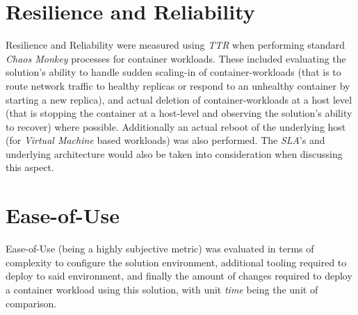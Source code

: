 \section{Resilience and Reliability}
Resilience and Reliability were measured using \textit{TTR} when performing standard \textit{Chaos Monkey} processes for container workloads.
These included evaluating the solution's ability to handle sudden scaling-in of container-workloads (that is to route network traffic to healthy replicas or respond to an unhealthy container by starting a new replica),
and actual deletion of container-workloads at a host level (that is stopping the container at a host-level and observing the solution's ability to recover) where possible.
Additionally an actual reboot of the underlying host (for \textit{Virtual Machine} based workloads) was also performed.
The \textit{SLA}'s and underlying architecture would also be taken into consideration when discussing this aspect.

\section{Ease-of-Use}
Ease-of-Use (being a highly subjective metric) was evaluated in terms of complexity to configure the solution environment, additional tooling required to deploy to said environment,
and finally the amount of changes required to deploy a container workload using this solution, with unit \textit{time} being the unit of comparison.
